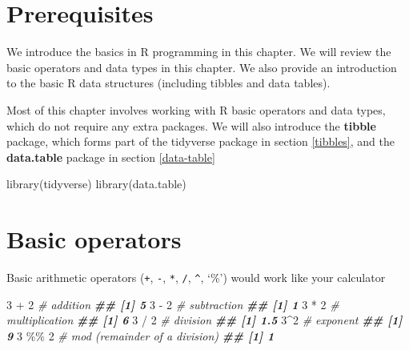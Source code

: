 \documentclass[
]{book}
\newenvironment{Shaded}{\begin{snugshade}}{\end{snugshade}}
\newcommand{\CommentTok}[1]{\textcolor[rgb]{0.56,0.35,0.01}{\textit{#1}}}
\newcommand{\DecValTok}[1]{\textcolor[rgb]{0.00,0.00,0.81}{#1}}
\newcommand{\DocumentationTok}[1]{\textcolor[rgb]{0.56,0.35,0.01}{\textbf{\textit{#1}}}}
\newcommand{\FunctionTok}[1]{\textcolor[rgb]{0.00,0.00,0.00}{#1}}
\newcommand{\NormalTok}[1]{#1}
\newcommand{\SpecialCharTok}[1]{\textcolor[rgb]{0.00,0.00,0.00}{#1}}
\begin{document}
\hypertarget{prerequisites-1}{%
\section{Prerequisites}\label{prerequisites-1}}

We introduce the basics in R programming in this chapter. We will review the basic operators and data types in this chapter. We also provide an introduction to the basic R data structures (including tibbles and data tables).

Most of this chapter involves working with R basic operators and data types, which do not require any extra packages. We will also introduce the \textbf{tibble} package, which forms part of the tidyverse package in section \ref{tibbles}, and the \textbf{data.table} package in section \ref{data-table}

\begin{Shaded}
\begin{Highlighting}[]
\FunctionTok{library}\NormalTok{(tidyverse)}
\FunctionTok{library}\NormalTok{(data.table)}
\end{Highlighting}
\end{Shaded}

\hypertarget{basic-operators}{%
\section{Basic operators}\label{basic-operators}}

Basic arithmetic operators (\texttt{+}, \texttt{-}, \texttt{*}, \texttt{/}, \texttt{\^{}}, `\%') would work like your calculator

\begin{Shaded}
\begin{Highlighting}[]
\DecValTok{3} \SpecialCharTok{+} \DecValTok{2} \CommentTok{\# addition}
\DocumentationTok{\#\# [1] 5}
\DecValTok{3} \SpecialCharTok{{-}} \DecValTok{2} \CommentTok{\# subtraction}
\DocumentationTok{\#\# [1] 1}
\DecValTok{3} \SpecialCharTok{*} \DecValTok{2} \CommentTok{\# multiplication}
\DocumentationTok{\#\# [1] 6}
\DecValTok{3} \SpecialCharTok{/} \DecValTok{2} \CommentTok{\# division}
\DocumentationTok{\#\# [1] 1.5}
\DecValTok{3}\SpecialCharTok{\^{}}\DecValTok{2} \CommentTok{\# exponent}
\DocumentationTok{\#\# [1] 9}
\DecValTok{3} \SpecialCharTok{\%\%} \DecValTok{2} \CommentTok{\# mod (remainder of a division)}
\DocumentationTok{\#\# [1] 1}
\end{Highlighting}
\end{Shaded}
\end{document}
